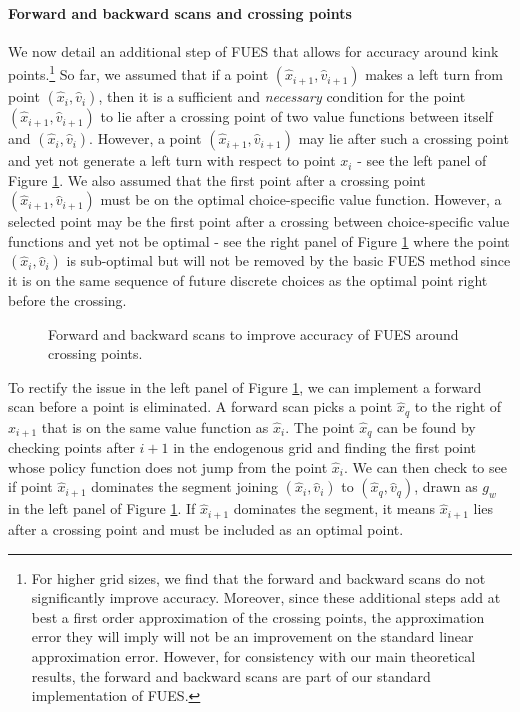\documentclass[12pt]{article}
\begin{document}
\paragraph{Forward and backward scans and crossing points}

We now detail an additional step of FUES that allows for accuracy around kink points.\footnote{For higher grid sizes, we find that the forward and backward scans do not significantly improve accuracy. Moreover, since these additional steps add at best a first order approximation of the crossing points, the approximation error they will imply will not be an improvement on the standard linear approximation error. However, for consistency with our main theoretical results, the forward and backward scans are  part of our standard implementation of FUES.} So far, we assumed that if a point $(\hat{x}_{i+1}, \hat{v}_{i+1})$ makes a left turn from point $(\hat{x}_{i}, \hat{v}_{i})$, then it is a sufficient and \textit{necessary} condition for the point $(\hat{x}_{i+1}, \hat{v}_{i+1})$ to lie after a crossing point of two value functions between itself and $(\hat{x}_{i}, \hat{v}_{i})$. However, a point $(\hat{x}_{i+1}, \hat{v}_{i+1})$ may lie after such a crossing point and yet not generate a left turn with respect to point $x_{i}$ - see the left panel of Figure \ref{fig: fscan}. We also assumed that the first point after a crossing point $(\hat{x}_{i+1}, \hat{v}_{i+1})$ must be on the optimal choice-specific value function. However, a selected point may be the first point after a crossing between choice-specific value functions and yet not be optimal - see the right panel of Figure \ref{fig: fscan} where the point $(\hat{x}_{i}, \hat{v}_{i})$ is sub-optimal but will not be removed by the basic FUES method since it is on the same sequence of future discrete choices as the optimal point right before the crossing.
%
\begin{figure}
\centering
\scalebox{0.95}{}
\captionsetup{width=.9\linewidth}
\caption{Forward and backward scans to improve accuracy of FUES around crossing points.}\label{fig: fscan}
\end{figure}
%
To rectify the issue in the left panel of Figure \ref{fig: fscan}, we can implement a forward scan before a point is eliminated. A forward scan picks a point $\hat{x}_{q}$ to the right of $\hat{x}_{i+1}$ that is on the same value function as $\hat{x}_{i}$. The point $\hat{x}_{q}$ can be found by checking points after $i+1$ in the endogenous grid and finding the first point whose policy function does not jump from the point $\hat{x}_{i}$.  We can then check to see if point $\hat{x}_{i+1}$ dominates the segment joining $(\hat{x}_{i},\hat{v}_{i})$ to $(\hat{x}_{q}, \hat{v}_{q})$, drawn as $g_{w}$ in the left panel of Figure \ref{fig: fscan}. If $\hat{x}_{i+1}$ dominates the segment, it means $\hat{x}_{i+1}$ lies after a crossing point and must be included as an optimal point.
\end{document}
